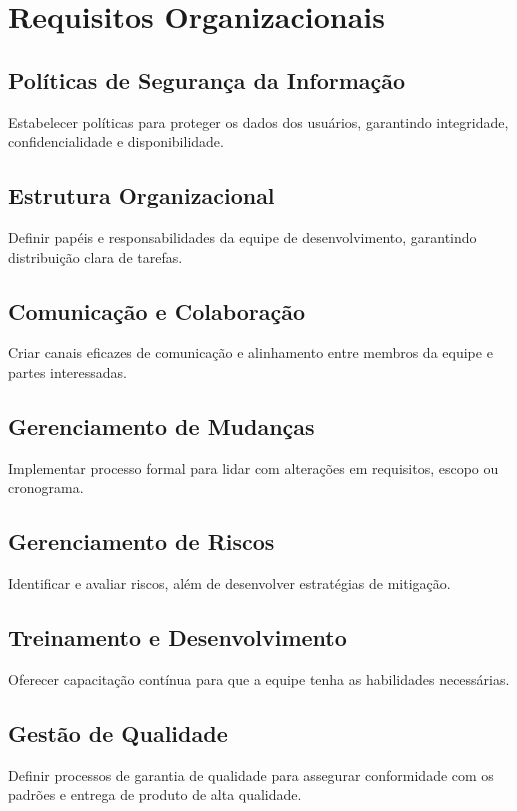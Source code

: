\chapter*{Requisitos Organizacionais}



\section{Políticas de Segurança da Informação}
Estabelecer políticas para proteger os dados dos usuários, garantindo integridade, confidencialidade e disponibilidade.

\section{Estrutura Organizacional}
Definir papéis e responsabilidades da equipe de desenvolvimento, garantindo 
distribuição clara de tarefas.

\section{Comunicação e Colaboração}
Criar canais eficazes de comunicação e alinhamento entre membros da equipe e partes interessadas.

\section{Gerenciamento de Mudanças}
Implementar processo formal para lidar com alterações em requisitos, escopo ou cronograma.

\section{Gerenciamento de Riscos}
Identificar e avaliar riscos, além de desenvolver estratégias de mitigação.

\section{Treinamento e Desenvolvimento}
Oferecer capacitação contínua para que a equipe tenha as habilidades necessárias.

\section{Gestão de Qualidade}
Definir processos de garantia de qualidade para assegurar conformidade com os padrões 
e entrega de produto de alta qualidade.